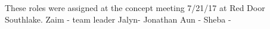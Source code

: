 These roles were assigned at the concept meeting 7/21/17 at Red Door Southlake.
Zaim - team leader
Jalyn-
Jonathan 
Aun - 
Sheba - 
